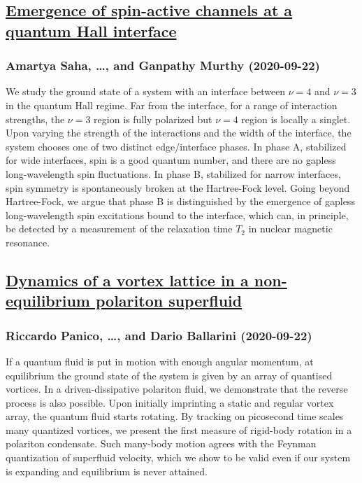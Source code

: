 {\subsection*{\href{http://arxiv.org/abs/2009.10539v1}{Emergence of spin-active channels at a quantum Hall interface}}
\subsubsection*{Amartya Saha, \dots, and Ganpathy Murthy (2020-09-22)}
We study the ground state of a system with an interface between $\nu=4$ and
$\nu=3$ in the quantum Hall regime. Far from the interface, for a range of
interaction strengths, the $\nu=3$ region is fully polarized but $\nu=4$ region
is locally a singlet. Upon varying the strength of the interactions and the
width of the interface, the system chooses one of two distinct edge/interface
phases. In phase A, stabilized for wide interfaces, spin is a good quantum
number, and there are no gapless long-wavelength spin fluctuations. In phase B,
stabilized for narrow interfaces, spin symmetry is spontaneously broken at the
Hartree-Fock level. Going beyond Hartree-Fock, we argue that phase B is
distinguished by the emergence of gapless long-wavelength spin excitations
bound to the interface, which can, in principle, be detected by a measurement
of the relaxation time $T_2$ in nuclear magnetic resonance.

\subsection*{\href{http://arxiv.org/abs/2009.10534v1}{Dynamics of a vortex lattice in a non-equilibrium polariton superfluid}}
\subsubsection*{Riccardo Panico, \dots, and Dario Ballarini (2020-09-22)}
If a quantum fluid is put in motion with enough angular momentum, at
equilibrium the ground state of the system is given by an array of quantised
vortices. In a driven-dissipative polariton fluid, we demonstrate that the
reverse process is also possible. Upon initially imprinting a static and
regular vortex array, the quantum fluid starts rotating. By tracking on
picosecond time scales many quantized vortices, we present the first measure of
rigid-body rotation in a polariton condensate. Such many-body motion agrees
with the Feynman quantization of superfluid velocity, which we show to be valid
even if our system is expanding and equilibrium is never attained.

}
